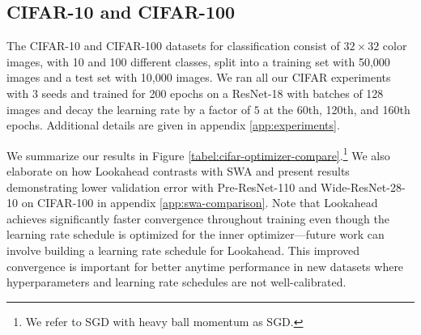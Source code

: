 
\subsection{CIFAR-10 and CIFAR-100} 
\label{sec:cifar}

The CIFAR-10 and CIFAR-100 datasets for classification consist of $32 \times 32$ color images, with 10 and 100 different classes, split into a training set with 50,000 images and a test set with 10,000 images. We ran all our CIFAR experiments with 3 seeds and trained for 200 epochs on a ResNet-18 \citep{he2016deep} with batches of 128 images and decay the learning rate by a factor of $5$ at the 60th, 120th, and 160th epochs.  Additional details are given in appendix \ref{app:experiments}.

We summarize our results in Figure \ref{tabel:cifar-optimizer-compare}.\footnote{We refer to SGD with heavy ball momentum \citep{polyak1964some} as SGD.} We also elaborate on how Lookahead contrasts with SWA and present results demonstrating lower validation error with Pre-ResNet-110 and Wide-ResNet-28-10 \cite{Zagoruyko2016WRN} on CIFAR-100 in appendix \ref{app:swa-comparison}.  Note that Lookahead achieves significantly faster convergence throughout training even though the learning rate schedule is optimized for the inner optimizer---future work can involve building a learning rate schedule for Lookahead. This improved convergence is important for better anytime performance in new datasets where hyperparameters and learning rate schedules are not well-calibrated.


